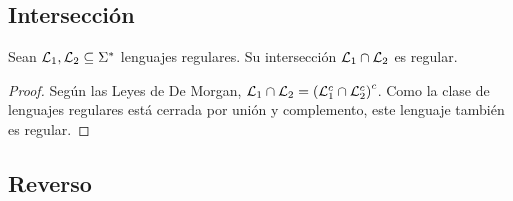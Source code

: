 \subsection{Intersección}

\begin{theorem*}
    Sean $\mathcal{L}_1, \mathcal{L}_2 \subseteq \Sigma^*$ lenguajes regulares. Su intersección $\mathcal{L}_1 \cap \mathcal{L}_2$ es regular.
\end{theorem*}
\begin{proof}
    Según las Leyes de De Morgan, $\mathcal{L}_1 \cap \mathcal{L}_2 = \left(\mathcal{L}_1^c \cap \mathcal{L}_2^c\right)^c$. Como la clase de lenguajes regulares está cerrada por unión y complemento, este lenguaje también es regular.
\end{proof}

\subsection{Reverso}
